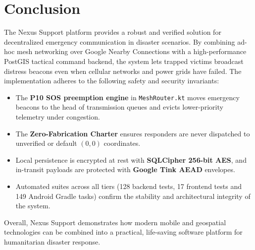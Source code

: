 \documentclass[12pt,a4paper]{report}
\begin{document}
\section{Conclusion}
The Nexus Support platform provides a robust and verified solution for decentralized emergency communication in disaster scenarios. By combining ad-hoc mesh networking over Google Nearby Connections with a high-performance PostGIS tactical command backend, the system lets trapped victims broadcast distress beacons even when cellular networks and power grids have failed. The implementation adheres to the following safety and security invariants:
\begin{itemize}
    \item The \textbf{P10 SOS preemption engine} in \texttt{MeshRouter.kt} moves emergency beacons to the head of transmission queues and evicts lower-priority telemetry under congestion.
    \item The \textbf{Zero-Fabrication Charter} ensures responders are never dispatched to unverified or default $(0,0)$ coordinates.
    \item Local persistence is encrypted at rest with \textbf{SQLCipher 256-bit AES}, and in-transit payloads are protected with \textbf{Google Tink AEAD} envelopes.
    \item Automated suites across all tiers (128 backend tests, 17 frontend tests and 149 Android Gradle tasks) confirm the stability and architectural integrity of the system.
\end{itemize}
Overall, Nexus Support demonstrates how modern mobile and geospatial technologies can be combined into a practical, life-saving software platform for humanitarian disaster response.
\end{document}
